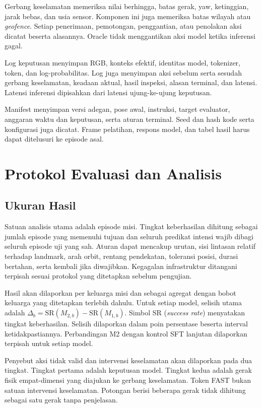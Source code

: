 Gerbang keselamatan memeriksa nilai berhingga, batas gerak, yaw, ketinggian, jarak bebas, dan usia sensor. Komponen ini juga memeriksa batas wilayah atau \textit{geofence}. Setiap penerimaan, pemotongan, penggantian, atau penolakan aksi dicatat beserta alasannya. Oracle tidak menggantikan aksi model ketika inferensi gagal.

Log keputusan menyimpan RGB, konteks efektif, identitas model, tokenizer, token, dan log-probabilitas. Log juga menyimpan aksi sebelum serta sesudah gerbang keselamatan, keadaan aktual, hasil inspeksi, alasan terminal, dan latensi. Latensi inferensi dipisahkan dari latensi ujung-ke-ujung keputusan.

Manifest menyimpan versi adegan, pose awal, instruksi, target evaluator, anggaran waktu dan keputusan, serta aturan terminal. Seed dan hash kode serta konfigurasi juga dicatat. Frame pelatihan, respons model, dan tabel hasil harus dapat ditelusuri ke episode asal.

\section{Protokol Evaluasi dan Analisis}
\label{sec:protokol_eksperimen}
\subsection{Ukuran Hasil}
Satuan analisis utama adalah episode misi. Tingkat keberhasilan dihitung sebagai jumlah episode yang memenuhi tujuan dan seluruh predikat intensi wajib dibagi seluruh episode uji yang sah. Aturan dapat mencakup urutan, sisi lintasan relatif terhadap landmark, arah orbit, rentang pendekatan, toleransi posisi, durasi bertahan, serta kembali jika diwajibkan. Kegagalan infrastruktur ditangani terpisah sesuai protokol yang ditetapkan sebelum pengujian.

Hasil akan dilaporkan per keluarga misi dan sebagai agregat dengan bobot keluarga yang ditetapkan terlebih dahulu. Untuk setiap model, selisih utama adalah $\Delta_b=\mathrm{SR}(M_{2,b})-\mathrm{SR}(M_{1,b})$. Simbol SR (\textit{success rate}) menyatakan tingkat keberhasilan. Selisih dilaporkan dalam poin persentase beserta interval ketidakpastiannya. Perbandingan M2 dengan kontrol SFT lanjutan dilaporkan terpisah untuk setiap model.

Penyebut aksi tidak valid dan intervensi keselamatan akan dilaporkan pada dua tingkat. Tingkat pertama adalah keputusan model. Tingkat kedua adalah gerak fisik empat-dimensi yang diajukan ke gerbang keselamatan. Token FAST bukan satuan intervensi keselamatan. Potongan berisi beberapa gerak tidak dihitung sebagai satu gerak tanpa penjelasan.

